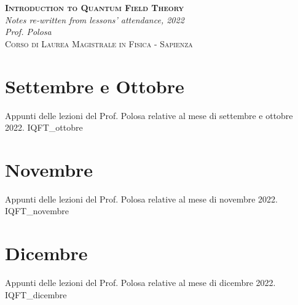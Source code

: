 \documentclass[10pt,a4paper]{report}
\begin{document}
\begin{titlepage}
	\centering
	\vspace*{50mm}
	\huge \textbf{\textsc{Introduction to Quantum Field Theory}} \\
	\vspace*{3mm}
	\Large \textit{Notes re-written from lessons' attendance, 2022} \\
	\Large \textit{Prof. Polosa} \\
	\vspace*{4mm}
	\Large \textsc{Corso di Laurea Magistrale in Fisica - Sapienza}
\end{titlepage}
\restoregeometry


\FloatBarrier
\chapter{Settembre e Ottobre}
Appunti delle lezioni del Prof. Polosa relative al mese di settembre e ottobre 2022.
{IQFT_ottobre}

\FloatBarrier
\chapter{Novembre}
Appunti delle lezioni del Prof. Polosa relative al mese di novembre 2022.
{IQFT_novembre}

\FloatBarrier
\chapter{Dicembre}
Appunti delle lezioni del Prof. Polosa relative al mese di dicembre 2022.
{IQFT_dicembre}
\end{document}
